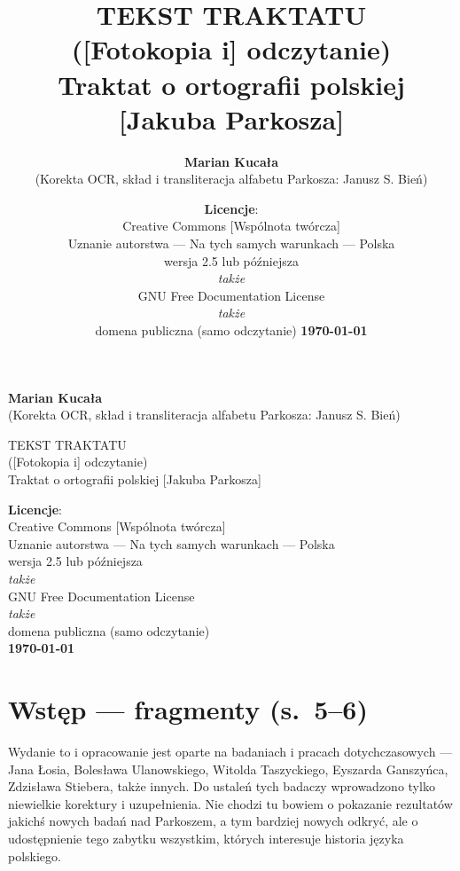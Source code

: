 \documentclass[dvipsnames,12pt]{report}
\author{\textbf{Marian Kucała}\\(Korekta OCR, skład i transliteracja alfabetu Parkosza: Janusz S. Bień)}
\title{TEKST TRAKTATU\\[-.5ex]([Fotokopia i] odczytanie)\\[-.5ex]Traktat o ortografii polskiej [Jakuba Parkosza]}
\date{\textbf{Licencje}:\\ \relsize{-1}Creative Commons [Wspólnota twórcza]\\[-.4ex]
Uznanie autorstwa --- Na tych samych warunkach --- Polska\\
wersja 2.5 lub późniejsza\\\textit{także}\\
GNU Free Documentation License\\\textit{także}\\
domena publiczna (samo odczytanie)
\textbf{\today}}
\begin{document}
\thispagestyle{empty}

\begin{titlepage}
{\textbf{Marian Kucała}\\(Korekta OCR, skład i transliteracja alfabetu Parkosza: Janusz S. Bień)} 

\vfill
{
{TEKST TRAKTATU\\[-.5ex]([Fotokopia i] odczytanie)\\[-.5ex]Traktat o ortografii polskiej [Jakuba Parkosza]}}

\vfill
{\textbf{Licencje}:\\ Creative Commons [Wspólnota twórcza]\\[-.4ex]
Uznanie autorstwa --- Na tych samych warunkach --- Polska\\
wersja 2.5 lub późniejsza\\\textit{także}\\
GNU Free Documentation License\\\textit{także}\\
domena publiczna (samo odczytanie)\\
\textbf{\today}}

\end{titlepage}

{}



\raggedright

\section*{Wstęp --- fragmenty (s.~5--6)}
\label{sec:wstp}
Wydanie to i opracowanie jest oparte na badaniach i pracach
dotychczasowych — Jana Łosia, Bolesława Ulanowskiego, Witolda
Taszyckiego, Eyszarda Ganszyńca, Zdzisława Stiebera, także innych. Do
ustaleń tych badaczy wprowadzono tylko niewielkie korektury i
uzupełnienia. Nie chodzi tu bowiem o pokazanie rezultatów jakichś
nowych badań nad Parkoszem, a tym bardziej nowych odkryć, ale o
udostępnienie tego zabytku wszystkim, których interesuje historia
języka polskiego.
\end{document}
